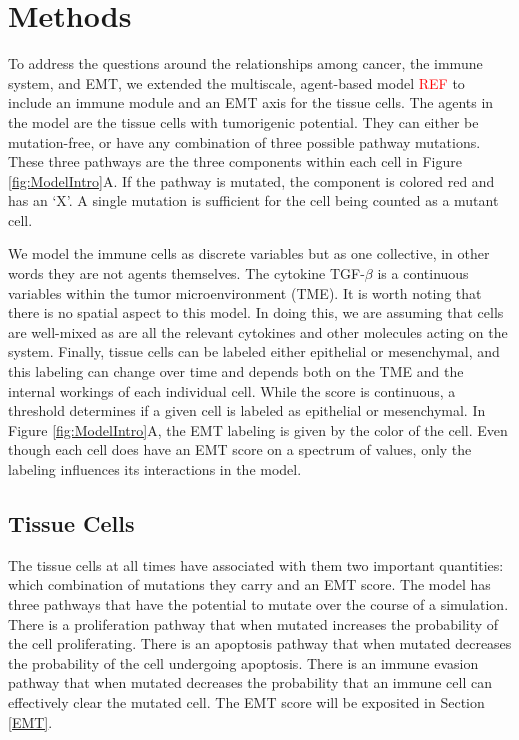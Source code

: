\documentclass[11pt, preprint]{article}
\newcommand{\tcr} { \textcolor{red} }
\begin{document}


\section{Methods}
To address the questions around the relationships among cancer, the immune system, and EMT, we extended the multiscale, agent-based model \tcr{REF} to include an immune module and an EMT axis for the tissue cells.
The agents in the model are the tissue cells with tumorigenic potential.
They can either be mutation-free, or have any combination of three possible pathway mutations.
These three pathways are the three components within each cell in Figure \ref{fig:ModelIntro}A.
If the pathway is mutated, the component is colored red and has an `X'.
A single mutation is sufficient for the cell being counted as a mutant cell.

We model the immune cells as discrete variables but as one collective, in other words they are not agents themselves.
The cytokine TGF-$\beta$ is a continuous variables within the tumor microenvironment (TME).
It is worth noting that there is no spatial aspect to this model.
In doing this, we are assuming that cells are well-mixed as are all the relevant cytokines and other molecules acting on the system.
Finally, tissue cells can be labeled either epithelial or mesenchymal, and this labeling can change over time and depends both on the TME and the internal workings of each individual cell.
While the score is continuous, a threshold determines if a given cell is labeled as epithelial or mesenchymal.
In Figure \ref{fig:ModelIntro}A, the EMT labeling is given by the color of the cell.
Even though each cell does have an EMT score on a spectrum of values, only the labeling influences its interactions in the model.

\subsection{Tissue Cells}\label{TissueCells}
The tissue cells at all times have associated with them two important quantities: which combination of mutations they carry and an EMT score.
The model has three pathways that have the potential to mutate over the course of a simulation.
There is a proliferation pathway that when mutated increases the probability of the cell proliferating.
There is an apoptosis pathway that when mutated decreases the probability of the cell undergoing apoptosis.
There is an immune evasion pathway that when mutated decreases the probability that an immune cell can effectively clear the mutated cell.
The EMT score will be exposited in Section \ref{EMT}. %
\end{document}
